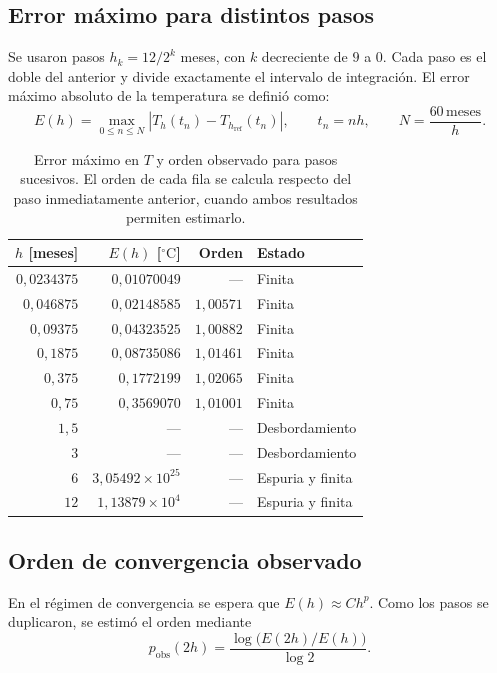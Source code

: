 \subsection{Error máximo para distintos pasos}
Se usaron pasos $h_k=12/2^k$ meses, con $k$ decreciente de $9$ a $0$.
Cada paso es el doble del anterior y divide exactamente el intervalo de
integración. El error máximo absoluto de la temperatura se definió como:
\begin{equation}
    E(h)=\max_{0\leq n\leq N}
    \left|T_h(t_n)-T_{h_{\mathrm{ref}}}(t_n)\right|,
    \qquad t_n=nh,\qquad N=\frac{60\,\mathrm{meses}}{h}.
    \label{eq:parte1-error}
\end{equation}

\begin{table}[H]
    \centering
    \small
    \caption{Error máximo en $T$ y orden observado para pasos sucesivos. El orden de cada fila se calcula respecto del paso inmediatamente anterior, cuando ambos resultados permiten estimarlo.}
    \label{tab:parte1-convergencia}
    \begin{tabular}{@{} r r r l @{}}
        \toprule
        $h$ [meses] & $E(h)$ [$^\circ\mathrm{C}$] & Orden & Estado \\
        \midrule
        $0{,}0234375$ & $0{,}01070049$ & ---       & Finita \\
        $0{,}046875$  & $0{,}02148585$ & $1{,}00571$ & Finita \\
        $0{,}09375$   & $0{,}04323525$ & $1{,}00882$ & Finita \\
        $0{,}1875$    & $0{,}08735086$ & $1{,}01461$ & Finita \\
        $0{,}375$     & $0{,}1772199$  & $1{,}02065$ & Finita \\
        $0{,}75$      & $0{,}3569070$  & $1{,}01001$ & Finita \\
        $1{,}5$       & ---            & ---        & Desbordamiento \\
        $3$           & ---            & ---        & Desbordamiento \\
        $6$           & $3{,}05492\times 10^{25}$ & --- & Espuria y finita \\
        $12$          & $1{,}13879\times 10^{4}$  & --- & Espuria y finita \\
        \bottomrule
    \end{tabular}
\end{table}

\subsection{Orden de convergencia observado}
En el régimen de convergencia se espera que $E(h)\approx C h^p$. Como
los pasos se duplicaron, se estimó el orden mediante
\begin{equation}
    p_{\mathrm{obs}}(2h)=\frac{\log\bigl(E(2h)/E(h)\bigr)}{\log 2}.
    \label{eq:parte1-orden}
\end{equation}

